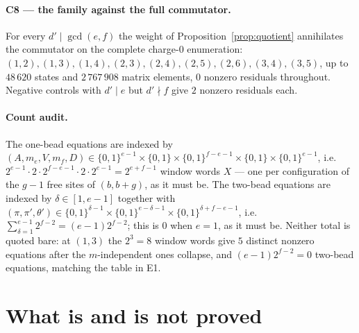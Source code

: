 \documentclass[11pt]{article}
\theoremstyle{definition}
\theoremstyle{remark}
\begin{document}
\paragraph{C8 --- the family against the full commutator.}  For every $d'\mid\gcd(e,f)$
the weight of Proposition~\ref{prop:quotient} annihilates the commutator on the complete
charge-$0$ enumeration: $(1,2),(1,3),(1,4),(2,3),(2,4),(2,5),(2,6),(3,4),(3,5)$, up to
$48\,620$ states and $2\,767\,908$ matrix elements, $0$ nonzero residuals throughout.
Negative controls with $d'\mid e$ but $d'\nmid f$ give $2$ nonzero residuals each.

\paragraph{Count audit.}  The one-bead equations are indexed by
$(A,m_e,V,m_f,D)\in\{0,1\}^{e-1}\times\{0,1\}\times\{0,1\}^{f-e-1}\times\{0,1\}\times\{0,1\}^{e-1}$,
i.e.\ $2^{e-1}\cdot2\cdot2^{f-e-1}\cdot2\cdot2^{e-1}=2^{e+f-1}$ window words $X$ --- one
per configuration of the $g-1$ free sites of $(b,b+g)$, as it must be.  The two-bead
equations are indexed by $\delta\in[1,e-1]$ together with
$(\pi,\pi',\theta')\in\{0,1\}^{\delta-1}\times\{0,1\}^{e-\delta-1}\times\{0,1\}^{\delta+f-e-1}$,
i.e.\ $\sum_{\delta=1}^{e-1}2^{f-2}=(e-1)2^{f-2}$; this is $0$ when $e=1$, as it must be.
Neither total is quoted bare: at $(1,3)$ the $2^{3}=8$ window words give $5$ distinct
nonzero equations after the $m$-independent ones collapse, and $(e-1)2^{f-2}=0$ two-bead
equations, matching the table in E1.

\section{What is and is not proved}\label{sec:gaps}
\end{document}
